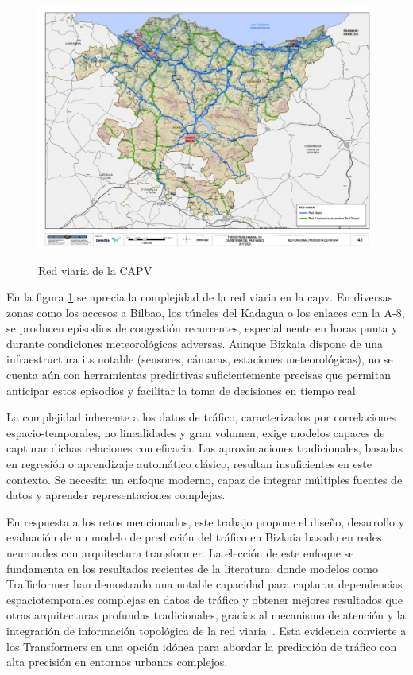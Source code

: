 \begin{figure}[H]
	\centering
	\caption[Red viaria de la CAPV]{Red viaria de la CAPV}
	\includegraphics[scale=0.5]{includes/red_viaria_capv.png}
	\label{fig:red_viaria}
\end{figure}

En la figura \ref{fig:red_viaria} se aprecia la complejidad de la red viaria en la \acrshort{capv}. En diversas zonas como los accesos a Bilbao, los túneles del Kadagua o los enlaces con la A-8, se producen episodios de congestión recurrentes, especialmente en horas punta y durante condiciones meteorológicas adversas. Aunque Bizkaia dispone de una infraestructura \acrshort{its} notable (sensores, cámaras, estaciones meteorológicas), no se cuenta aún con herramientas predictivas suficientemente precisas que permitan anticipar estos episodios y facilitar la toma de decisiones en tiempo real.

La complejidad inherente a los datos de tráfico, caracterizados por correlaciones espacio-temporales, no linealidades y gran volumen, exige modelos capaces de capturar dichas relaciones con eficacia. Las aproximaciones tradicionales, basadas en regresión o aprendizaje automático clásico, resultan insuficientes en este contexto. Se necesita un enfoque moderno, capaz de integrar múltiples fuentes de datos y aprender representaciones complejas.

En respuesta a los retos mencionados, este trabajo propone el diseño, desarrollo y evaluación de un modelo de predicción del tráfico en Bizkaia basado en redes neuronales con arquitectura transformer. La elección de este enfoque se fundamenta en los resultados recientes de la literatura, donde modelos como Trafficformer han demostrado una notable capacidad para capturar dependencias espaciotemporales complejas en datos de tráfico y obtener mejores resultados que otras arquitecturas profundas tradicionales, gracias al mecanismo de atención y la integración de información topológica de la red viaria \cite{trafficformer}. Esta evidencia convierte a los Transformers en una opción idónea para abordar la predicción de tráfico con alta precisión en entornos urbanos complejos.

